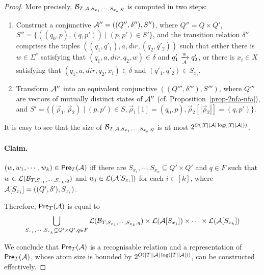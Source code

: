 \begin{proof}
More precisely, $\mathcal{B}_{T, \mathcal{A}, S_{x_1}, \cdots, S_{x_k}, q}$ is computed in two steps:
\begin{enumerate} 
\item Construct a conjunctive \FFA{} $\mathcal{A}'' = ((Q'', \delta''), S'')$, where $Q'' = Q \times Q'$, $S'' = \{((q_0, p), (q, p')) \mid (p, p') \in S'\}$, and the transition relation $\delta''$ comprises the tuples $((q_1, q'_1), a, dir, (q_2, q'_2))$ such that either there is $w \in \Sigma^*$ satisfying that $(q_1, a, dir, q_2, w) \in \delta$ and $q'_1 \xrightarrow[\mathcal{A}]{w} q'_2$, or there is $x_i \in X$ satisfying that $(q_1, a, dir, q_2, x_i) \in \delta$  and $(q'_1, q'_2) \in S_{x_i}$.
%
\item Transform $\mathcal{A}''$ into an equivalent conjunctive \FA{} $((Q''',\delta'''), S''')$, where $Q'''$ are vectors of mutually distinct states of $\mathcal{A}''$ (cf. Proposition~\ref{prop-2nfa-nfa}),  and $S' = \{(\vec{\rho}_1, \vec{\rho}_2) \mid  (p, p') \in S, \vec{\rho}_1[1] =(q_0, p), \vec{\rho}_2[|\vec{\rho}_2|] = (q, p') \}$.
%
\end{enumerate} 
It is easy to see that  the size of $\mathcal{B}_{T, \mathcal{A}, S_{x_1}, \cdots, S_{x_k}, q}$ is at most 
$2^{O(|T||\mathcal{A}| \log(|T||\mathcal{A}|))}$.   



\paragraph{Claim.} %
$(w, w_1,\cdots, w_k) \in \textsf{Pre}_{T}(\mathcal{A})$ iff there are $S_{x_1}, \cdots, S_{x_k} \subseteq Q' \times Q'$ and $q \in F$ such that $w \in \mathcal{L}(\mathcal{B}_{T, S_{x_1}, \cdots, S_{x_k}, q})$ and $w_i \in \mathcal{L}(\mathcal{A}[S_{x_i}])$ for each $i \in [k]$, where $\mathcal{A}[S_{x_i}]=((Q', \delta'), S_{x_i})$.

\medskip


Therefore, $\textsf{Pre}_{T}(\mathcal{A})$ is equal to 
\[
\bigcup_{S_{x_1}, \cdots, S_{x_k} \subseteq Q' \times Q', q\in F} \mathcal{L}(\mathcal{B}_{T, S_{x_1}, \cdots, S_{x_k},q}) \times \mathcal{L}(\mathcal{A}[S_{x_1}]) \times \cdots  \times \mathcal{L}(\mathcal{A}[S_{x_k}])\]
 


We conclude that $\textsf{Pre}_{T}(\mathcal{A})$ is a recognisable relation and a representation of $\textsf{Pre}_{T}(\mathcal{A})$, whose atom size is bounded by $2^{O(|T||\mathcal{A}|\log (|T||\mathcal{A}|))}$, can be constructed effectively.
\end{proof}

